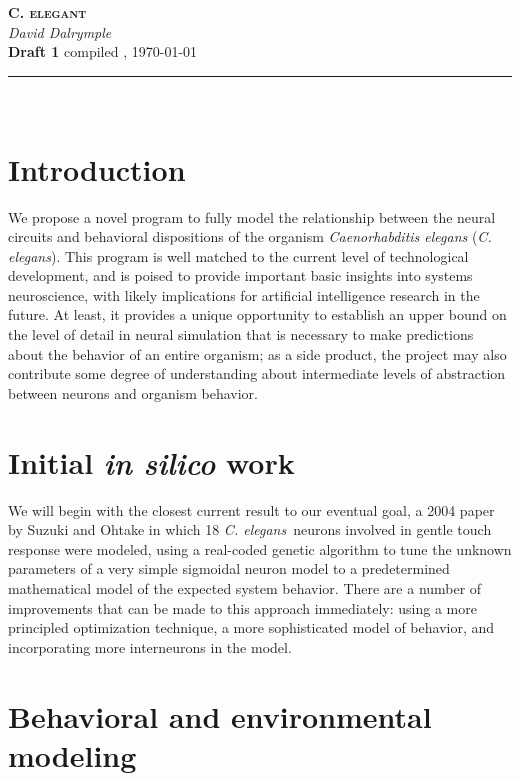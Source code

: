 \documentclass[letter,11pt]{article}
\newcommand{\cel}{{\em C. elegans}}
\begin{document}
\begin{center}
	\textsc{\LARGE \bfseries C. elegant}\\[1mm]
	\textit{David Dalrymple}\\[1mm]
	{\small {\bfseries \color{red} Draft 1} compiled \currenttime, \today\\[0mm]}
	\rule[2mm]{0.66\textwidth}{0.25mm}\\[10mm]
\end{center}

\section{Introduction}

We propose a novel program to fully model the relationship between the neural
circuits and behavioral dispositions of the organism {\em Caenorhabditis
elegans} (\cel).  This program is well matched to the current level of
technological development, and is poised to provide important basic insights
into systems neuroscience, with likely implications for artificial intelligence
research in the future. At least, it provides a unique opportunity to establish
an upper bound on the level of detail in neural simulation that is necessary to
make predictions about the behavior of an entire organism; as a side product,
the project may also contribute some degree of understanding about intermediate
levels of abstraction between neurons and organism behavior.

\section{Initial {\em in silico} work}
\label{initial}

We will begin with the closest current result to our eventual goal, a 2004
paper by Suzuki and Ohtake in which 18 \cel\ neurons involved in gentle touch
response were modeled, using a real-coded genetic algorithm to tune the unknown
parameters of a very simple sigmoidal neuron model to a predetermined mathematical
model of the expected system behavior. There are a number of improvements that
can be made to this approach immediately: using a more principled optimization
technique, a more sophisticated model of behavior, and incorporating more
interneurons in the model.

\section{Behavioral and environmental modeling}
\end{document}
